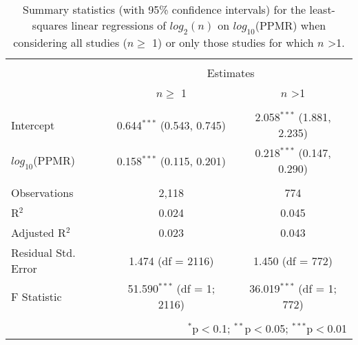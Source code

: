 
\begin{table}[!htbp] \centering 
  \caption{Summary statistics (with 95\% confidence intervals) for the least-squares linear regressions of $log_2(n)$ on $log_{10}$(PPMR) when considering all studies ($n \geq$ 1) or only those studies for which $n$ \textgreater 1.} 
  \label{tab:n-ppmr} 
\begin{tabular}{@{\extracolsep{5pt}}lcc} 
\\[-1.8ex]\hline 
\hline \\[-1.8ex] 
 & \multicolumn{2}{c}{Estimates} \\ 
\cline{2-3} 
 & $n \geq$ 1 & $n$ \textgreater 1 \\ 
\hline \\[-1.8ex] 
 Intercept & 0.644$^{***}$ (0.543, 0.745) & 2.058$^{***}$ (1.881, 2.235) \\ 
  $log_{10}$(PPMR) & 0.158$^{***}$ (0.115, 0.201) & 0.218$^{***}$ (0.147, 0.290) \\ 
 \hline \\[-1.8ex] 
Observations & 2,118 & 774 \\ 
R$^{2}$ & 0.024 & 0.045 \\ 
Adjusted R$^{2}$ & 0.023 & 0.043 \\ 
Residual Std. Error & 1.474 (df = 2116) & 1.450 (df = 772) \\ 
F Statistic & 51.590$^{***}$ (df = 1; 2116) & 36.019$^{***}$ (df = 1; 772) \\ 
\hline 
\hline \\[-1.8ex] 
\multicolumn{3}{r}{$^{*}$p$<$0.1; $^{**}$p$<$0.05; $^{***}$p$<$0.01} \\ 
\end{tabular} 
\end{table} 
